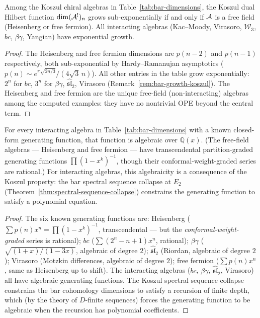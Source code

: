 \begin{corollary}
\label{cor:subexp-free-field}
Among the Koszul chiral algebras in Table~\textup{\ref{tab:bar-dimensions}}, the Koszul dual Hilbert function $\dim (\mathcal{A}^!)_n$ grows sub-exponentially if and only if $\mathcal{A}$ is a free field (Heisenberg or free fermion).  All interacting algebras (Kac--Moody, Virasoro, $\mathcal{W}_3$, $bc$, $\beta\gamma$, Yangian) have exponential growth.
\end{corollary}

\begin{proof}
The Heisenberg and free fermion dimensions are $p(n-2)$ and $p(n-1)$ respectively, both sub-exponential by Hardy--Ramanujan asymptotics ($p(n) \sim e^{\pi\sqrt{2n/3}}/(4\sqrt{3}\,n)$).  All other entries in the table grow exponentially: $2^n$ for $bc$, $3^n$ for $\beta\gamma$, $\widehat{\mathfrak{sl}}_2$, Virasoro (Remark~\ref{rem:bar-growth-koszul}).  The Heisenberg and free fermion are the unique free-field (non-interacting) algebras among the computed examples: they have no nontrivial OPE beyond the central term.
\end{proof}

\begin{corollary}
\label{cor:algebraicity-koszul}
For every interacting algebra in Table~\textup{\ref{tab:bar-dimensions}} with a known closed-form generating function, that function is algebraic over $\mathbb{Q}(x)$.  (The free-field algebras --- Heisenberg and free fermion --- have transcendental partition-graded generating functions $\prod(1-x^k)^{-1}$, though their conformal-weight-graded series are rational.)  For interacting algebras, this algebraicity is a consequence of the Koszul property: the bar spectral sequence collapse at $E_2$ (Theorem~\ref{thm:spectral-sequence-collapse}) constrains the generating function to satisfy a polynomial equation.
\end{corollary}

\begin{proof}
The six known generating functions are:
Heisenberg ($\sum p(n) x^n = \prod(1-x^k)^{-1}$, transcendental --- but the \emph{conformal-weight-graded} series is rational);
$bc$ ($\sum (2^n - n + 1) x^n$, rational);
$\beta\gamma$ ($\sqrt{(1+x)/(1-3x)}$, algebraic of degree $2$);
$\widehat{\mathfrak{sl}}_2$ (Riordan, algebraic of degree $2$);
Virasoro (Motzkin differences, algebraic of degree $2$);
free fermion ($\sum p(n) x^n$, same as Heisenberg up to shift).
The interacting algebras ($bc$, $\beta\gamma$, $\widehat{\mathfrak{sl}}_2$, Virasoro) all have algebraic generating functions.  The Koszul spectral sequence collapse constrains the bar cohomology dimensions to satisfy a recursion of finite depth, which (by the theory of $D$-finite sequences) forces the generating function to be algebraic when the recursion has polynomial coefficients.
\end{proof}

